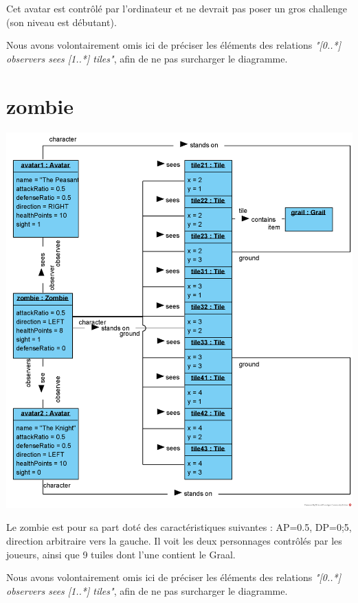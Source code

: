 \documentclass[oneside,a4paper]{book}
\begin{document}
Cet avatar est contrôlé par l'ordinateur et ne devrait pas poser un gros challenge (son niveau est débutant).

    \begin{tcolorbox}
    Nous avons volontairement omis ici de préciser les éléments des relations \textit{"[0..*] observers sees [1..*] tiles"}, afin de ne pas surcharger le diagramme.
    \end{tcolorbox}

\section{zombie}
\includegraphics[width=\textwidth,height=\textheight,keepaspectratio]{Diagrams/OD-Zombie.png}\newline

Le zombie est pour sa part doté des caractéristiques suivantes : AP=0.5, DP=0;5, direction arbitraire vers la gauche. Il voit les deux personnages contrôlés par les joueurs, ainsi que 9 tuiles dont l'une contient le Graal.

    \begin{tcolorbox}
    Nous avons volontairement omis ici de préciser les éléments des relations \textit{"[0..*] observers sees [1..*] tiles"}, afin de ne pas surcharger le diagramme.
    \end{tcolorbox}
\end{document}
